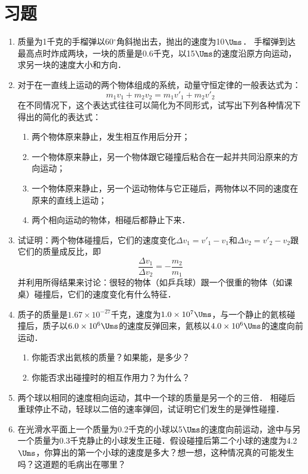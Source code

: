 \section*{习题}
\begin{enumerate}
    \item 质量为1千克的手榴弹以60$^\circ$角斜抛出去，抛出的速度为10$\Ums$．
    手榴弹到达最高点时炸成两块，一块的质量是0.6千克，以15$\Ums$的速度沿原方向运动，求另一块的速度大小和方向．
    \item 对于在一直线上运动的两个物体组成的系统，动量守恒定律的一般表达式为：
\[m_1v_1+m_2v_2=m_1v'_1+m_2v'_2 \]
    在不同情况下，这个表达式往往可以简化为不同形式，试写出下列各种情况下得出的简化的表达式：
\begin{enumerate}
    \item 两个物体原来静止，发生相互作用后分开；
    \item 一个物体原来静止，另一个物体跟它碰撞后粘合在一起并共同沿原来的方向运动；
    \item 一个物体原来静止，另一个运动物体与它正碰后，两物体以不同的速度在原来的直线上运动；
    \item 两个相向运动的物体，相碰后都静止下来．
\end{enumerate}
\item 试证明：两个物体碰撞后，它们的速度变化$\Delta v_1=v'_1-v_1$和$\Delta v_2=v'_2-v_2$跟它们的质量成反比，即
\[\frac{\Delta v_1}{\Delta v_2}=-\frac{m_2}{m_1}\]
并利用所得结果来讨论：很轻的物体（如乒兵球）跟一个很重的物体（如课桌）碰撞后，它们的速度变化有什么特征．
\item 质子的质量是$1.67\times 10^{-27}$千克，速度为$1.0\times 10^7\Ums$，与一个静止的氦核碰撞后，质子以$6.0\times 10^6\Ums$的速度反弹回来，氦核以$4.0\times 10^6\Ums$的速度向前运动．
   \begin{enumerate}
       \item 你能否求出氦核的质量？如果能，是多少？
       \item 你能否求出碰撞时的相互作用力？为什么？
   \end{enumerate}
   \item 两个球以相同的速度相向运动，其中一个球的质量是另一个的三倍．
   相碰后重球停止不动，轻球以二倍的速率弹回，试证明它们发生的是弹性碰撞．
   \item 在光滑水平面上一个质量为0.2千克的小球以5$\Ums$的速度向前运动，途中与另一个质量为0.3千克静止的小球发生正碰．假设碰撞后第二个小球的速度为4.2$\Ums$，你算出的第一个小球的速度是多大？想一想，这种情况真的可能发生吗？这道题的毛病出在哪里？
\begin{figure}[htbp]

\end{figure}
\end{enumerate}
